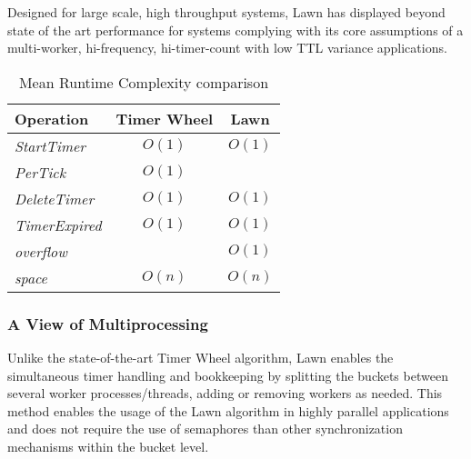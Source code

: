 \documentclass[acmsmall]{acmart} %
\begin{document}
Designed for large scale, high throughput systems, Lawn has displayed beyond state of the art performance for systems complying with its core assumptions of a multi-worker, hi-frequency, hi-timer-count with low TTL variance applications.


\begin{table}[h!]
	\begin{center}
		\begin{tabular}{l|c|c}
			\textbf{Operation} & \textbf{Timer Wheel} & \textbf{Lawn} \\
			\hline
			\textit{StartTimer} & $O(1)$ & $O(1)$ \\
			\textit{PerTick} & $O(1)$ & \boldmath{$O(t\sim1)$} \\
			\textit{DeleteTimer} & $O(1)$ & $O(1)$ \\
			\textit{TimerExpired} & $O(1)$ & $O(1)$ \\
			\textit{overflow} & \boldmath{$O(n)$} & $O(1)$ \\
			\textit{space} & $O(n)$ & $O(n)$ \\
		\end{tabular}
		\caption{Mean Runtime Complexity comparison}
		\label{tab:table1}
	\end{center}
\end{table}

\subsubsection{A View of Multiprocessing}
Unlike the state-of-the-art Timer Wheel algorithm, Lawn enables the simultaneous timer handling and bookkeeping by splitting the buckets between several worker processes/threads, adding or removing workers as needed. This method enables the usage of the Lawn algorithm in highly parallel applications and does not require the use of semaphores than other synchronization mechanisms within the bucket level.
\end{document}
